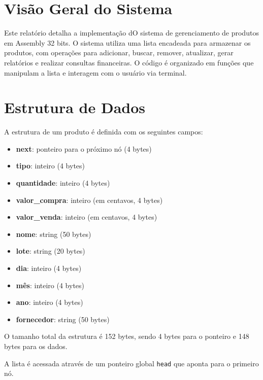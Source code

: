 \documentclass[12pt]{article}
\begin{document}


\tableofcontents
\newpage

\section{Visão Geral do Sistema}
Este relatório detalha a implementação dO sistema de gerenciamento de produtos em Assembly 32 bits. O sistema utiliza uma lista encadeada para armazenar os produtos, com operações para adicionar, buscar, remover, atualizar, gerar relatórios e realizar consultas financeiras. O código é organizado em funções que manipulam a lista e interagem com o usuário via terminal.

\section{Estrutura de Dados}
A estrutura de um produto é definida com os seguintes campos:
\begin{itemize}
    \item \textbf{next}: ponteiro para o próximo nó (4 bytes)
    \item \textbf{tipo}: inteiro (4 bytes)
    \item \textbf{quantidade}: inteiro (4 bytes)
    \item \textbf{valor\_compra}: inteiro (em centavos, 4 bytes)
    \item \textbf{valor\_venda}: inteiro (em centavos, 4 bytes)
    \item \textbf{nome}: string (50 bytes)
    \item \textbf{lote}: string (20 bytes)
    \item \textbf{dia}: inteiro (4 bytes)
    \item \textbf{mês}: inteiro (4 bytes)
    \item \textbf{ano}: inteiro (4 bytes)
    \item \textbf{fornecedor}: string (50 bytes)
\end{itemize}

O tamanho total da estrutura é 152 bytes, sendo 4 bytes para o ponteiro e 148 bytes para os dados.

A lista é acessada através de um ponteiro global \texttt{head} que aponta para o primeiro nó.
\end{document}
